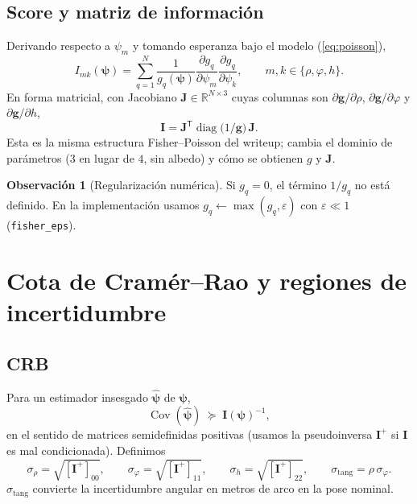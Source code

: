 \documentclass[11pt,a4paper]{article}
\theoremstyle{definition}
\newtheorem{remark}{Observaci\'on}
\newcommand{\vect}[1]{\boldsymbol{#1}}
\newcommand{\matr}[1]{\mathbf{#1}}
\newcommand{\R}{\mathbb{R}}
\DeclareMathOperator{\diag}{diag}
\DeclareMathOperator{\Cov}{Cov}
\begin{document}
\subsection{Score y matriz de informaci\'on}
Derivando respecto a $\psi_m$ y tomando esperanza bajo el modelo
(\ref{eq:poisson}),
\begin{equation}
    I_{mk}(\vect{\psi})
    =
    \sum_{q=1}^{N}
    \frac{1}{g_q(\vect{\psi})}
    \frac{\partial g_q}{\partial\psi_m}
    \frac{\partial g_q}{\partial\psi_k},
    \qquad
    m,k\in\{\rho,\varphi,h\}.
    \label{eq:I}
\end{equation}
En forma matricial, con Jacobiano $\matr{J}\in\R^{N\times 3}$ cuyas columnas
son $\partial\vect{g}/\partial\rho$, $\partial\vect{g}/\partial\varphi$ y
$\partial\vect{g}/\partial h$,
\begin{equation}
    \matr{I}
    =
    \matr{J}^{\mathsf T}
    \diag\bigl(1/\vect{g}\bigr)\,
    \matr{J}.
    \label{eq:I-mat}
\end{equation}
Esta es la misma estructura Fisher--Poisson del writeup; cambia el dominio
de par\'ametros ($3$ en lugar de $4$, sin albedo) y c\'omo se obtienen $g$ y $\matr{J}$.

\begin{remark}[Regularizaci\'on num\'erica]
Si $g_q=0$, el t\'ermino $1/g_q$ no est\'a definido.
En la implementaci\'on usamos $g_q\leftarrow\max(g_q,\varepsilon)$ con
$\varepsilon\ll 1$ (\texttt{fisher\_eps}).
\end{remark}

\section{Cota de Cram\'er--Rao y regiones de incertidumbre}
\label{sec:crb}

\subsection{CRB}
Para un estimador insesgado $\hat{\vect{\psi}}$ de $\vect{\psi}$,
\begin{equation}
    \Cov(\hat{\vect{\psi}})
    \;\succeq\;
    \matr{I}(\vect{\psi})^{-1},
\end{equation}
en el sentido de matrices semidefinidas positivas
(usamos la pseudoinversa $\matr{I}^{+}$ si $\matr{I}$ es mal condicionada).
Definimos
\begin{equation}
    \sigma_\rho
    =
    \sqrt{[\matr{I}^{+}]_{00}},
    \qquad
    \sigma_\varphi
    =
    \sqrt{[\matr{I}^{+}]_{11}},
    \qquad
    \sigma_h
    =
    \sqrt{[\matr{I}^{+}]_{22}},
    \qquad
    \sigma_{\mathrm{tang}}
    =
    \rho\,\sigma_\varphi.
\end{equation}
$\sigma_{\mathrm{tang}}$ convierte la incertidumbre angular en metros de arco
en la pose nominal.
\end{document}
